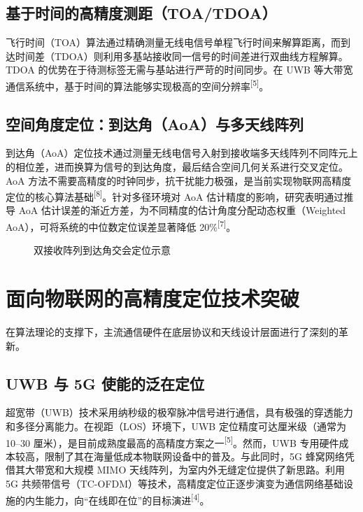\documentclass[UTF8,a4paper,12pt]{ctexart}
\newcommand{\refmark}[1]{\textsuperscript{[#1]}}
\begin{document}
\subsection{基于时间的高精度测距（TOA/TDOA）}
飞行时间（TOA）算法通过精确测量无线电信号单程飞行时间来解算距离，而到达时间差（TDOA）则利用多基站接收同一信号的时间差进行双曲线方程解算。TDOA 的优势在于待测标签无需与基站进行严苛的时间同步。在 UWB 等大带宽通信系统中，基于时间的算法能够实现极高的空间分辨率\refmark{5}。
\subsection{空间角度定位：到达角（AoA）与多天线阵列}
到达角（AoA）定位技术通过测量无线电信号入射到接收端多天线阵列不同阵元上的相位差，进而换算为信号的到达角度，最后结合空间几何关系进行交叉定位。AoA 方法不需要高精度的时钟同步，抗干扰能力极强，是当前实现物联网高精度定位的核心算法基础\refmark{8}。针对多径环境对 AoA 估计精度的影响，研究表明通过推导 AoA 估计误差的渐近方差，为不同精度的估计角度分配动态权重（Weighted AoA），可将系统的中位数定位误差显著降低 20\%\refmark{7}。
\begin{figure}[htbp]
\centering
{}
\caption{双接收阵列到达角交会定位示意}
\label{fig:aoa}
\end{figure}

\section{面向物联网的高精度定位技术突破}
在算法理论的支撑下，主流通信硬件在底层协议和天线设计层面进行了深刻的革新。
\subsection{UWB 与 5G 使能的泛在定位}
超宽带（UWB）技术采用纳秒级的极窄脉冲信号进行通信，具有极强的穿透能力和多径分离能力。在视距（LOS）环境下，UWB 定位精度可达厘米级（通常为 10--30 厘米），是目前成熟度最高的高精度方案之一\refmark{5}。然而，UWB 专用硬件成本较高，限制了其在海量低成本物联网设备中的普及。与此同时，5G 蜂窝网络凭借其大带宽和大规模 MIMO 天线阵列，为室内外无缝定位提供了新思路。利用 5G 共频带信号（TC-OFDM）等技术，高精度定位正逐步演变为通信网络基础设施的内生能力，向“在线即在位”的目标演进\refmark{4}。
\end{document}
